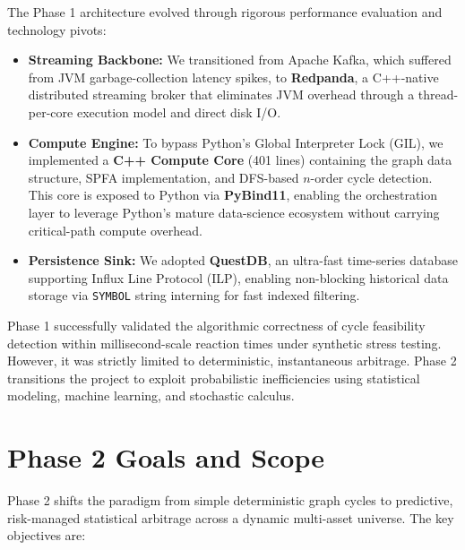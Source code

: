\documentclass[letterpaper,11pt]{report}
\begin{document}
The Phase 1 architecture evolved through rigorous performance evaluation and technology pivots:
\begin{itemize}
    \item \textbf{Streaming Backbone:} We transitioned from Apache Kafka, which suffered from JVM garbage-collection latency spikes, to \textbf{Redpanda}, a C++-native distributed streaming broker that eliminates JVM overhead through a thread-per-core execution model and direct disk I/O.
    \item \textbf{Compute Engine:} To bypass Python's Global Interpreter Lock (GIL), we implemented a \textbf{C++ Compute Core} (401 lines) containing the graph data structure, SPFA implementation, and DFS-based $n$-order cycle detection. This core is exposed to Python via \textbf{PyBind11}, enabling the orchestration layer to leverage Python's mature data-science ecosystem without carrying critical-path compute overhead.
    \item \textbf{Persistence Sink:} We adopted \textbf{QuestDB}, an ultra-fast time-series database supporting Influx Line Protocol (ILP), enabling non-blocking historical data storage via \texttt{SYMBOL} string interning for fast indexed filtering.
\end{itemize}

Phase 1 successfully validated the algorithmic correctness of cycle feasibility detection within millisecond-scale reaction times under synthetic stress testing. However, it was strictly limited to deterministic, instantaneous arbitrage. Phase 2 transitions the project to exploit probabilistic inefficiencies using statistical modeling, machine learning, and stochastic calculus.


\chapter{Phase 2 Goals and Scope}

Phase 2 shifts the paradigm from simple deterministic graph cycles to predictive, risk-managed statistical arbitrage across a dynamic multi-asset universe. The key objectives are:
\end{document}
